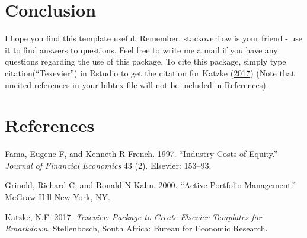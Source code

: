 \documentclass[11pt,preprint, authoryear]{elsarticle}
\numberwithin{equation}{section}
\numberwithin{figure}{section}
\numberwithin{table}{section}
\begin{document}
\section{Conclusion}\label{conclusion}

I hope you find this template useful. Remember, stackoverflow is your
friend - use it to find answers to questions. Feel free to write me a
mail if you have any questions regarding the use of this package. To
cite this package, simply type citation(``Texevier'') in Rstudio to get
the citation for Katzke (\protect\hyperlink{ref-Texevier}{2017}) (Note
that uncited references in your bibtex file will not be included in
References).

\section*{References}\label{references}

\hypertarget{refs}{}
\hypertarget{ref-fama1997}{}
Fama, Eugene F, and Kenneth R French. 1997. ``Industry Costs of
Equity.'' \emph{Journal of Financial Economics} 43 (2). Elsevier:
153--93.

\hypertarget{ref-grinold2000}{}
Grinold, Richard C, and Ronald N Kahn. 2000. ``Active Portfolio
Management.'' McGraw Hill New York, NY.

\hypertarget{ref-Texevier}{}
Katzke, N.F. 2017. \emph{Texevier: Package to Create Elsevier Templates
for Rmarkdown}. Stellenbosch, South Africa: Bureau for Economic
Research.




\end{document}
